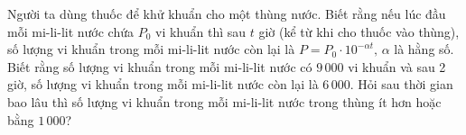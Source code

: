 \begin{ex}%
	Người ta dùng thuốc để khử khuẩn cho một thùng nước. Biết rằng nếu lúc đầu mỗi mi-li-lit nước chứa $P_{0}$ vi khuẩn thì sau $t$ giờ (kể từ khi cho thuốc vào thùng), số lượng vi khuẩn trong mỗi mi-li-lit nước còn lại  là $P=P_{0} \cdot 10^{-\alpha t}, \,\alpha$ là hằng số. Biết rằng số lượng vi khuẩn trong mỗi mi-li-lit nước có $9\,000$ vi khuẩn và sau 2 giờ, số lượng vi khuẩn trong mỗi mi-li-lit nước còn lại là $6\,000$. Hỏi sau thời gian bao lâu thì số lượng vi khuẩn trong mỗi mi-li-lit nước trong thùng ít hơn hoặc bằng $1\,000$?
\end{ex}

